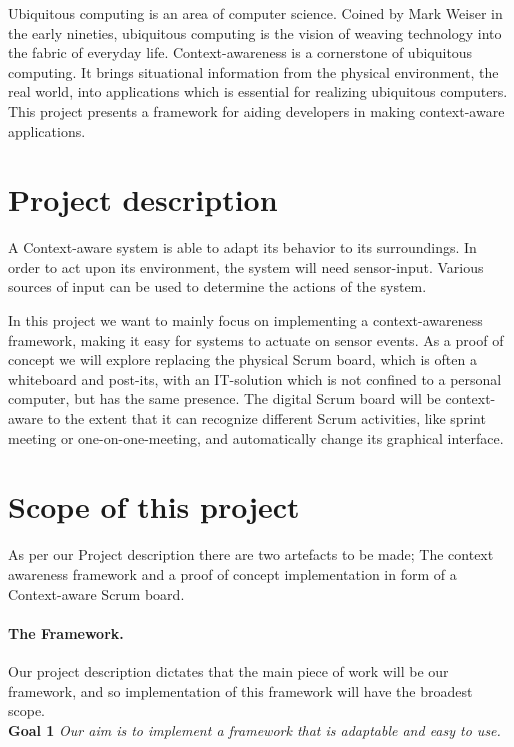 \documentclass[../report.tex]{subfiles}
\begin{document}
\graphicspath{{img/}{../img/}}
Ubiquitous computing is an area of computer science. Coined by Mark Weiser in the early nineties, ubiquitous computing is the vision of weaving technology into the fabric of everyday life. Context-awareness is a cornerstone of ubiquitous computing. It brings situational information from the physical environment, the real world, into applications which is essential for realizing ubiquitous computers. This project presents a framework for aiding developers in making context-aware applications.

\section{Project description}
A Context-aware system is able to adapt its behavior to its surroundings. In order to act upon its environment, the system will need sensor-input. Various sources of input can be used to determine the actions of the system.

In this project we want to mainly focus on implementing a context-awareness framework, making it easy for systems to actuate on sensor events. As a proof of concept we will explore replacing the physical Scrum board, which is often a whiteboard and post-its, with an IT-solution which is not confined to a personal computer, but has the same presence. The digital Scrum board will be context-aware to the extent that it can recognize different Scrum activities, like sprint meeting or one-on-one-meeting, and automatically change its graphical interface.


\section{Scope of this project}
\label{scrope}

As per our Project description there are two artefacts to be made; The context awareness framework and a proof of concept implementation in form of a Context-aware Scrum board.

\paragraph{The Framework.} 
Our project description dictates that the main piece of work will be our framework, and so implementation of this framework will have the broadest scope.\\

\textbf{Goal 1} \textit{Our aim is to implement a framework that is adaptable and easy to use.}
\end{document}
